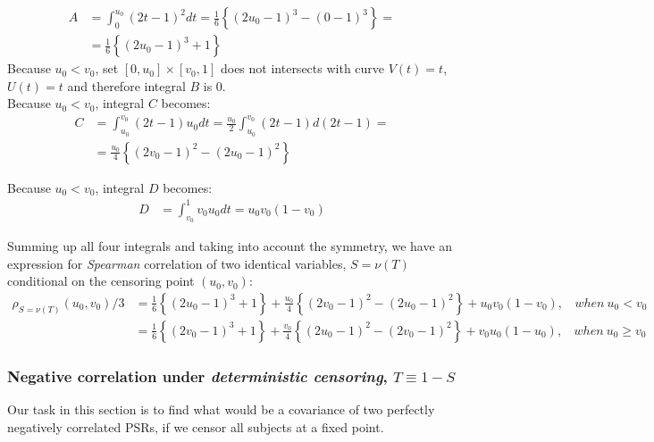 \documentclass[]{article}
\begin{document}
	$$
	\begin{aligned}
    A &= \int_0^{u_0} (2t - 1)^2 dt = \frac{1}{6}\left\{  (2u_0 - 1)^3 - (0-1)^3\right\}=\\
     &= \frac{1}{6}\left\{  (2u_0 - 1)^3 + 1\right\}
	\end{aligned}
	$$
Because $u_0 < v_0$, set $[0, u_0]\times [v_0, 1]$ does not intersects with curve $V(t)=t$, $U(t) = t$ and therefore integral $B$ is 0.\\
Because $u_0 < v_0$,  integral $C$ becomes:
	$$
	\begin{aligned}
    C &= \int_{u_0}^{v_0} (2t - 1)u_0 dt = \frac{u_0}{2} \int_{u_0}^{v_0}  (2t - 1) d(2t - 1) = \\
    &= \frac{u_0}{4}\left\{  (2v_0 - 1)^2 -(2u_0 - 1)^2 \right\}
	\end{aligned}
	$$

Because $u_0 < v_0$,  integral $D$ becomes:
	$$
	\begin{aligned}
    D &= \int_{v_0}^{1} v_0 u_0 dt = u_0 v_0 (1 - v_0)
	\end{aligned}
	$$

Summing up all four integrals and taking into account the symmetry, we have an expression for \emph{Spearman} correlation of two identical variables, $S = \nu( T)$ conditional on the censoring point $(u_0, v_0)$:
	$$
	\begin{aligned}
    \rho_{S = \nu( T)}(u_0, v_0)/3 &= \frac{1}{6}\left\{  (2u_0 - 1)^3 +1\right\} +  \frac{u_0}{4}\left\{  (2v_0 - 1)^2 -(2u_0 - 1)^2 \right\} + u_0 v_0 (1 - v_0), ~~~~when~u_0 < v_0\\
    &= \frac{1}{6}\left\{  (2v_0 - 1)^3 +1\right\} +  \frac{v_0}{4}\left\{  (2u_0 - 1)^2 -(2v_0 - 1)^2 \right\} + v_0 u_0 (1 - u_0), ~~~~when~u_0 \geq v_0
	\end{aligned}
	$$


\subsubsection{Negative correlation under \emph{deterministic censoring}, $T\equiv 1-S$}

Our task in this section is to find what would be a covariance of two perfectly negatively correlated PSRs, if we censor all subjects at a fixed point.\\
\end{document}
